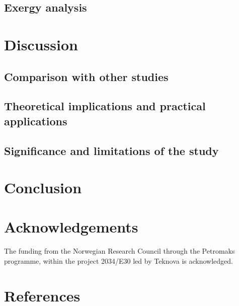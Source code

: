 \documentclass[final,times,3p]{elsarticle}
\begin{document}
\subsection{Exergy analysis}


\section{Discussion}
\label{sec:discussion}

	\subsection{Comparison with other studies}

	\subsection{Theoretical implications and practical applications}


	
	\subsection{Significance and limitations of the study}


\section{Conclusion}
\label{sec:conclusion}
			

\section*{Acknowledgements}
The funding from the Norwegian Research Council through the Petromaks programme, within the project 2034/E30 led by Teknova is acknowledged. 


\appendix



\section*{References}
\label{References}



			
\end{document}
